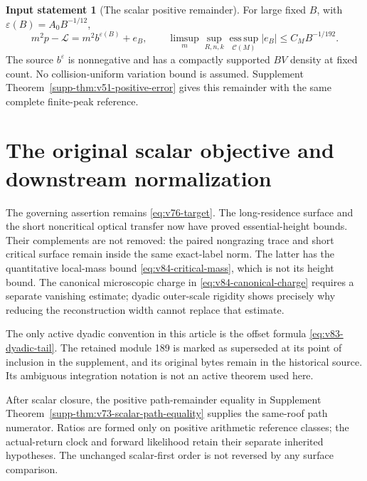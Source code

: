 \documentclass[11pt,reqno]{amsart}
\numberwithin{equation}{section}
\theoremstyle{definition}\newtheorem{definition}[theorem]{Definition}
\theoremstyle{remark}\newtheorem{remark}[theorem]{Remark}
\theoremstyle{definition}\newtheorem{inputstatement}[theorem]{Input statement}
\newcommand{\esssup}{\operatorname*{ess\,sup}}
\begin{document}
\begin{inputstatement}[The scalar positive remainder]
\label{input:v83-scalar}
For large fixed $B$, with $\varepsilon(B)=A_0B^{-1/12}$,
\begin{equation}\label{eq:v76-remainder}
 m^2p-\mathcal L=m^2b^{\varepsilon(B)}+e_B,\qquad
 \limsup_m\sup_{R,n,k}\esssup_{\mathcal C(M)}|e_B|
                                      \le C_MB^{-1/192}.
\end{equation}
The source $b^\varepsilon$ is nonnegative and has a compactly supported
$BV$ density at fixed count. No collision-uniform variation bound is
assumed. Supplement Theorem~\ref{supp-thm:v51-positive-error} gives
this remainder with the same complete finite-peak reference.
\end{inputstatement}










\section{The original scalar objective and downstream normalization}
The governing assertion remains \eqref{eq:v76-target}. The long-residence
surface and the short noncritical optical transfer now have proved
essential-height bounds. Their complements are not removed: the
paired nongrazing trace and short critical surface remain inside the
same exact-label norm. The latter has the quantitative local-mass
bound \eqref{eq:v84-critical-mass}, which is not its height bound.
The canonical microscopic charge in \eqref{eq:v84-canonical-charge}
requires a separate vanishing estimate; dyadic outer-scale rigidity
shows precisely why reducing the reconstruction width cannot replace
that estimate.

The only active dyadic convention in this article is the offset formula
\eqref{eq:v83-dyadic-tail}. The retained module 189 is marked as
superseded at its point of inclusion in the supplement, and its original
bytes remain in the historical source. Its ambiguous integration
notation is not an active theorem used here.

After scalar closure, the positive path-remainder equality in
Supplement Theorem~\ref{supp-thm:v73-scalar-path-equality} supplies
the same-roof path numerator. Ratios are formed only on positive
arithmetic reference classes; the actual-return clock and forward
likelihood retain their separate inherited hypotheses. The unchanged
scalar-first order is not reversed by any surface comparison.
\end{document}
